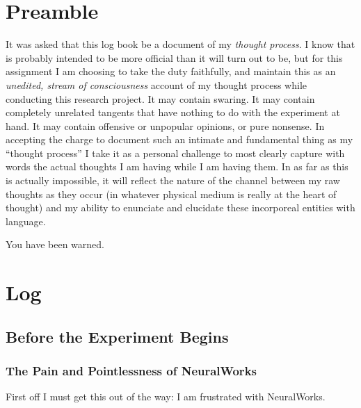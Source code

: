 \documentclass[12pt]{article}
\begin{document}
\maketitle

\section{Preamble}

It was asked that this log book be a document of my \emph{thought process}.  I know that is probably intended to be more official than it will turn out to be, but for this assignment I am choosing to take the duty faithfully, and maintain this as an \emph{unedited, stream of consciousness} account of my thought process while conducting this research project.  It may contain swaring.  It may contain completely unrelated tangents that have nothing to do with the experiment at hand.  It may contain offensive or unpopular opinions, or pure nonsense.  In accepting the charge to document such an intimate and fundamental thing as my ``thought process'' I take it as a personal challenge to most clearly capture with words the actual thoughts I am having while I am having them.  In as far as this is actually impossible, it will reflect the nature of the channel between my raw thoughts as they occur (in whatever physical medium is really at the heart of thought) and my ability to enunciate and elucidate these incorporeal entities with language.  

You have been warned.

\section{Log}

\subsection{Before the Experiment Begins}

\subsubsection{The Pain and Pointlessness of NeuralWorks}

First off I must get this out of the way: I am frustrated with NeuralWorks.  
\end{document}
